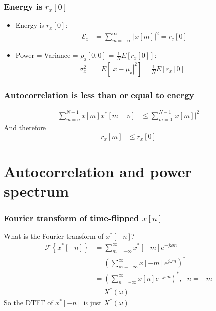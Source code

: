 \documentclass{beamer}
\begin{document}
\begin{frame}
  \frametitle{Energy is $r_x[0]$}

  \begin{itemize}
  \item Energy is $r_x[0]$:
    \begin{align*}
      \mathcal{E}_x &= \sum_{m=-\infty}^\infty |x[m]|^2 = r_x[0]
    \end{align*}
  \item Power = Variance = $\rho_x[0,0]$ = $\frac{1}{N}E\left[r_x[0]\right]$:
    \begin{align*}
      \sigma_x^2 &= E\left[|x-\mu_x|^2\right] = \frac{1}{N}E\left[r_x[0]\right]
    \end{align*}
  \end{itemize}
\end{frame}

\begin{frame}
  \frametitle{Autocorrelation is less than or equal to energy}

  \begin{align*}
    \sum_{m=n}^{N-1} x[m]x^*[m-n] &\le \sum_{m=0}^{N-1} |x[m]|^2
  \end{align*}
  And therefore
  \begin{align*}
    r_x[m] & \le r_x[0]
  \end{align*}

\end{frame}

\section[Spectrum]{Autocorrelation and power spectrum}


\begin{frame}
  \frametitle{Fourier transform of time-flipped $x[n]$}

  What is the Fourier transform of $x^*[-n]$?
  \begin{align*}
    \mathcal{F}\left\{x^*[-n]\right\} &= \sum_{m=-\infty}^\infty x^*[-m]e^{-j\omega m}\\
    &= \left(\sum_{m=-\infty}^\infty x[-m]e^{j\omega m}\right)^*\\
    &= \left(\sum_{n=-\infty}^\infty x[n]e^{-j\omega n}\right)^*,~~~n=-m\\
    &= X^*(\omega)
  \end{align*}
  So the DTFT of $x^*[-n]$ is just $X^*(\omega)$!
\end{frame}
\end{document}
